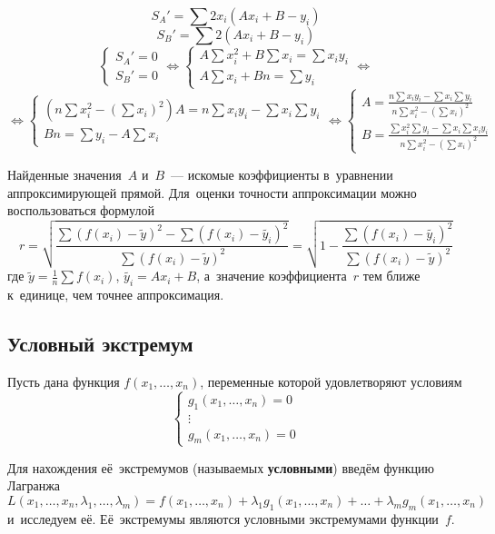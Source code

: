 	\[ S_A' = \sum 2 x_i (A x_i + B - y_i) \]
	\[ S_B' = \sum 2 (A x_i + B - y_i) \]
	\[
\begin{cases}
	\displaystyle S_A' = 0 \\
	\displaystyle S_B' = 0
\end{cases}
	\Leftrightarrow
\begin{cases}
	\displaystyle A \sum x_i^2 + B \sum x_i = \sum x_i y_i \\
	\displaystyle A \sum x_i + Bn = \sum y_i
\end{cases}
	\Leftrightarrow
	\]
	\[
	\Leftrightarrow
\begin{cases}
	\displaystyle \left(n \sum x_i^2 - \left(\sum x_i\right)^2\right)A = n \sum x_i y_i - \sum x_i \sum y_i \\
	\displaystyle Bn = \sum y_i - A \sum x_i
\end{cases}
	\Leftrightarrow
\begin{cases}
	\displaystyle A = \frac{\displaystyle n \sum x_i y_i - \sum x_i \sum y_i}{\displaystyle n \sum x_i^2 - \left(\sum x_i\right)^2} \\
	\displaystyle B = \frac{\displaystyle \sum x_i^2 \sum y_i - \sum x_i \sum x_i y_i}{\displaystyle n \sum x_i^2 - \left(\sum x_i\right)^2}
\end{cases}
	\]
	
	Найденные значения~$A$ и~$B$~--- искомые коэффициенты в~уравнении аппроксимирующей прямой.
	Для~оценки точности аппроксимации можно воспользоваться формулой
	\[ r = \sqrt{\frac
	{\sum (f(x_i) - \tilde y)^2 - \sum (f(x_i) - \tilde{y_i})^2}
	{\sum (f(x_i) - \tilde y)^2}} =
	\sqrt{1 - \frac{\sum (f(x_i) - \tilde{y_i})^2}{\sum (f(x_i) - \tilde y)^2}} \]
	где $\tilde y = \frac1n \sum f(x_i)$, $\tilde{y_i} = A x_i + B$, а~значение коэффициента~$r$ тем ближе к~единице, чем точнее аппроксимация.
	
\subsection{Условный экстремум}
	Пусть дана функция $f(x_1, \ldots, x_n)$, переменные которой удовлетворяют условиям
	\[
\begin{cases}
	g_1(x_1, \ldots, x_n) = 0 \\
	\vdots \\
	g_m(x_1, \ldots, x_n) = 0
\end{cases}
	\]

	Для нахождения её~экстремумов (называемых \textbf{условными}) введём функцию Лагранжа
	\[L(x_1, \ldots, x_n, \lambda_1, \ldots, \lambda_m) =
	f(x_1, \ldots, x_n) + \lambda_1 g_1(x_1, \ldots, x_n) + \ldots + \lambda_m g_m(x_1, \ldots, x_n)\]
	и~исследуем её.
	Её~экстремумы являются условными экстремумами функции~$f$.